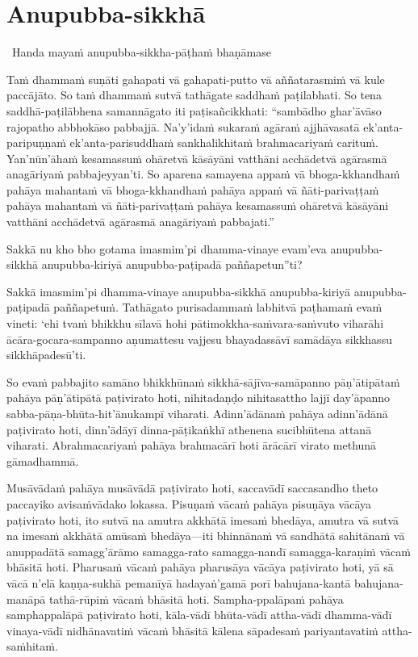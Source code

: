 \suttaRef{[SN 56.11]}


\section{Anupubba-sikkhā}

\begin{leader}
  \anglebracketleft\ \hspace{-0.5mm}Handa mayaṁ anupubba-sikkha-pāṭhaṁ bhaṇāmase \hspace{-0.5mm}\anglebracketright\
\end{leader}

Taṁ dhammaṁ suṇāti gahapati vā gahapati-putto vā aññatarasmiṁ vā kule paccājāto. So taṁ dhammaṁ sutvā tathāgate saddhaṁ paṭilabhati. So tena saddhā-paṭilābhena samannāgato iti paṭisañcikkhati: ``sambādho ghar'āvāso rajopatho abbhokāso pabbajjā. Na'y'idaṁ sukaraṁ agāraṁ ajjhāvasatā ek'anta-paripuṇṇaṁ ek'anta-parisuddhaṁ sankhalikhitaṁ brahmacariyaṁ carituṁ. Yan'nūn'āhaṁ kesamassuṁ ohāretvā kāsāyāni vatthāni acchādetvā agārasmā anagāriyaṁ pabbajeyyan'ti. So aparena samayena appaṁ vā bhoga-kkhandhaṁ pahāya mahantaṁ vā bhoga-kkhandhaṁ pahāya appaṁ vā ñāti-parivaṭṭaṁ pahāya mahantaṁ vā ñāti-parivaṭṭaṁ pahāya kesamassuṁ ohāretvā kāsāyāni vatthāni acchādetvā agārasmā anagāriyaṁ pabbajati.''

\suttaRef{[MN 27 / 38 / 51]}

Sakkā nu kho bho gotama imasmim'pi dhamma-vinaye evam'eva anupubba-sikkhā anupubba-kiriyā anupubba-paṭipadā paññapetun''ti?

Sakkā imasmim'pi dhamma-vinaye anupubba-sikkhā anupubba-kiriyā anupubba-paṭipadā paññapetuṁ. Tathāgato purisadammaṁ labhitvā paṭhamaṁ evaṁ vineti: `ehi tvaṁ bhikkhu sīlavā hohi pātimokkha-saṁvara-saṁvuto viharāhi ācāra-gocara-sampanno aṇumattesu vajjesu bhayadassāvī samādāya sikkhassu sikkhāpadesū'ti.

\suttaRef{[MN 107]}

So evaṁ pabbajito samāno bhikkhūnaṁ sikkhā-sājīva-samāpanno pāṇ'ātipātaṁ pahāya pāṇ'ātipātā paṭivirato hoti, nihitadaṇḍo nihitasattho lajjī day'āpanno sabba-pāṇa-bhūta-hit'ānukampī viharati. Adinn'ādānaṁ pahāya adinn'ādānā paṭivirato hoti, dinn'ādāyī dinna-pāṭikaṅkhī athenena sucibhūtena attanā viharati. Abrahmacariyaṁ pahāya brahmacārī hoti ārācārī virato methunā gāmadhammā.

Musāvādaṁ pahāya musāvādā paṭivirato hoti, saccavādī saccasandho theto paccayiko avisaṁvādako lokassa. Pisuṇaṁ vācaṁ pahāya pisuṇāya vācāya paṭivirato hoti, ito sutvā na amutra akkhātā imesaṁ bhedāya, amutra vā sutvā na imesaṁ akkhātā amūsaṁ bhedāya—iti bhinnānaṁ vā sandhātā sahitānaṁ vā anuppadātā samagg'ārāmo samagga-rato samagga-nandī samagga-karaṇiṁ vācaṁ bhāsitā hoti. Pharusaṁ vācaṁ pahāya pharusāya vācāya paṭivirato hoti, yā sā vācā n'elā kaṇṇa-sukhā pemanīyā hadayaṅ'gamā porī bahujana-kantā bahujana-manāpā tathā-rūpiṁ vācaṁ bhāsitā hoti. Sampha-ppalāpaṁ pahāya samphappalāpā paṭivirato hoti, kāla-vādī bhūta-vādī attha-vādī dhamma-vādī vinaya-vādī nidhānavatiṁ vācaṁ bhāsitā kālena sāpadesaṁ pariyantavatiṁ attha-saṁhitaṁ.


